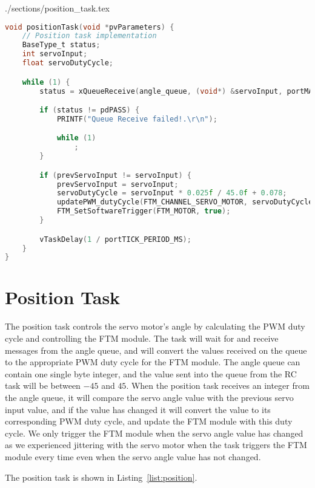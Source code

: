 \begin{filecontents}[overwrite]{./sections/position_task.tex}
\begin{lstlisting}[language=c,caption=Position Task, label=list:position]
void positionTask(void *pvParameters) {
    // Position task implementation
    BaseType_t status;
    int servoInput;
    float servoDutyCycle;

    while (1) {
        status = xQueueReceive(angle_queue, (void*) &servoInput, portMAX_DELAY);

        if (status != pdPASS) {
            PRINTF("Queue Receive failed!.\r\n");

            while (1)
                ;
        }

        if (prevServoInput != servoInput) {
            prevServoInput = servoInput;
            servoDutyCycle = servoInput * 0.025f / 45.0f + 0.078;
            updatePWM_dutyCycle(FTM_CHANNEL_SERVO_MOTOR, servoDutyCycle);
            FTM_SetSoftwareTrigger(FTM_MOTOR, true);
        }

        vTaskDelay(1 / portTICK_PERIOD_MS);
    }
}
\end{lstlisting}
\end{filecontents}

\section*{Position Task}

The position task controls the servo motor's angle by calculating the PWM duty cycle and controlling the FTM module. The task will wait for and receive messages from the angle queue, and will convert the values received on the queue to the appropriate PWM duty cycle for the FTM module. The angle queue can contain one single byte integer, and the value sent into the queue from the RC task will be between $-45$ and $45$. When the position task receives an integer from the angle queue, it will compare the servo angle value with the previous servo input value, and if the value has changed it will convert the value to its corresponding PWM duty cycle, and update the FTM module with this duty cycle. We only trigger the FTM module when the servo angle value has changed as we experienced jittering with the servo motor when the task triggers the FTM module every time even when the servo angle value has not changed.

The position task is shown in Listing~\ref{list:position}.

